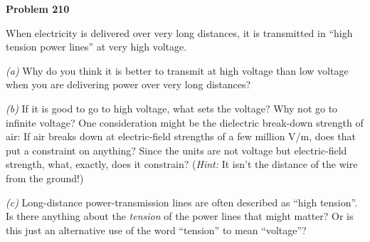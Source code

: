 \documentclass[12pt]{article}
\begin{document}
\begin{pottproblem}
\textbf{Problem 210}

When electricity is delivered over very long distances, it is
transmitted in ``high tension power lines'' at very high voltage.

\textsl{(a)} Why do you think it is better to transmit at high
voltage than low voltage when you are delivering power over very
long distances?

\textsl{(b)} If it is good to go to high voltage, what sets the
voltage? Why not go to infinite voltage? One consideration might be
the dielectric break-down strength of air: If air breaks down at
electric-field strengths of a few million V/m, does that put a
constraint on anything? Since the units are not voltage but
electric-field strength, what, exactly, does it constrain?
(\emph{Hint:} It isn't the distance of the wire from the ground!)

\textsl{(c)} Long-distance power-transmission lines are often
described as ``high tension''. Is there anything about the
\emph{tension} of the power lines that might matter? Or is this
just an alternative use of the word ``tension'' to mean ``voltage''?

\end{pottproblem}
\end{document}
